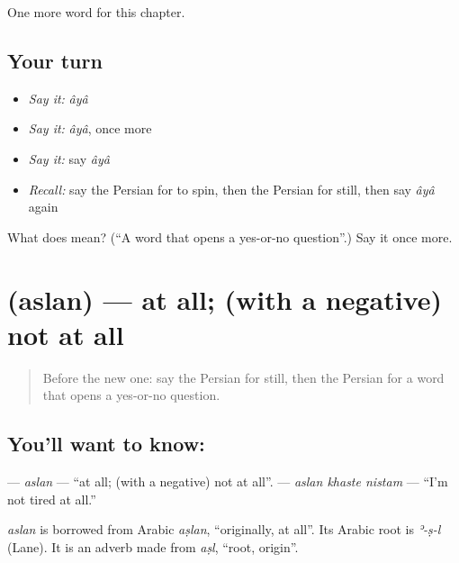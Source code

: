 \begin{grammarlens}[title={What you've built}]
One more word for this chapter.
\end{grammarlens}

\subsection*{Your turn}
\begin{itemize}
\raggedright
  \item \emph{Say it:} \emph{âyâ}
  \item \emph{Say it:} \emph{âyâ}, once more
  \item \emph{Say it:} say \emph{âyâ}
  \item \emph{Recall:} say the Persian for to spin, then the Persian for still, then say \emph{âyâ} again
\end{itemize}

\begin{tcolorbox}[breakable,colback=teal!4,colframe=teal!35!black,title={Before you move on}]
What does  mean? (\textquotedblleft{}A word that opens a yes-or-no question\textquotedblright{}.) Say it once more.
\end{tcolorbox}
\section[\texorpdfstring{\fa{اصلا} (aslan)}{اصلا (aslan)}]{ (aslan) — at all; (with a negative) not at all}

\label{lesson:FA-C136-aslan}



\begin{quote}
Before the new one: say the Persian for still, then the Persian for a word that opens a yes-or-no question.
\end{quote}

\subsection*{You'll want to know: }
\textbf{} — \emph{aslan} — \textquotedblleft{}at all; (with a negative) not at all\textquotedblright{}. \textbf{  } — \emph{aslan khaste nistam} — \textquotedblleft{}I'm not tired at all.\textquotedblright{}

\begin{cousinweb}
\emph{aslan} is borrowed from Arabic \emph{aṣlan}, \textquotedblleft{}originally, at all\textquotedblright{}. Its Arabic root is \emph{ʾ-ṣ-l} (Lane). It is an adverb made from \emph{aṣl}, \textquotedblleft{}root, origin\textquotedblright{}.
\end{cousinweb}

